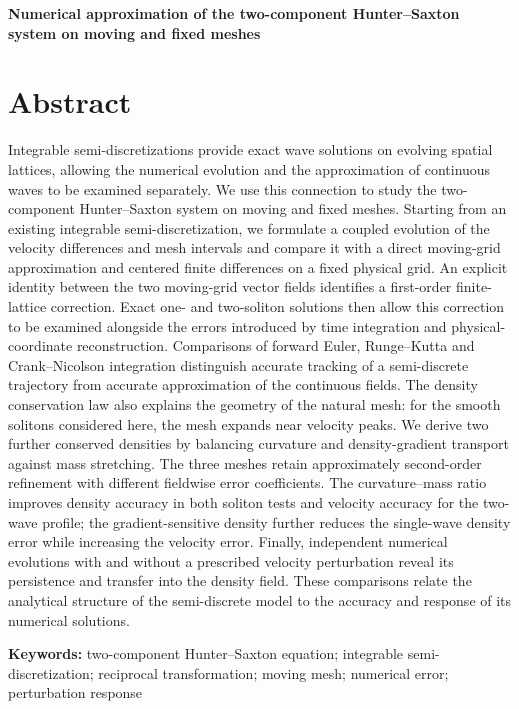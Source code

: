 \documentclass[11pt,a4paper]{article}
\begin{document}
{\centering\LARGE\bfseries Numerical approximation of the two-component Hunter–Saxton system on moving and fixed meshes\par}
\vspace{1.2em}
 
\FloatBarrier
\section*{Abstract}

Integrable semi-discretizations provide exact wave solutions on evolving spatial lattices, allowing the numerical evolution and the approximation of continuous waves to be examined separately. We use this connection to study the two-component Hunter–Saxton system on moving and fixed meshes. Starting from an existing integrable semi-discretization, we formulate a coupled evolution of the velocity differences and mesh intervals and compare it with a direct moving-grid approximation and centered finite differences on a fixed physical grid. An explicit identity between the two moving-grid vector fields identifies a first-order finite-lattice correction. Exact one- and two-soliton solutions then allow this correction to be examined alongside the errors introduced by time integration and physical-coordinate reconstruction. Comparisons of forward Euler, Runge–Kutta and Crank–Nicolson integration distinguish accurate tracking of a semi-discrete trajectory from accurate approximation of the continuous fields. The density conservation law also explains the geometry of the natural mesh: for the smooth solitons considered here, the mesh expands near velocity peaks. We derive two further conserved densities by balancing curvature and density-gradient transport against mass stretching. The three meshes retain approximately second-order refinement with different fieldwise error coefficients. The curvature--mass ratio improves density accuracy in both soliton tests and velocity accuracy for the two-wave profile; the gradient-sensitive density further reduces the single-wave density error while increasing the velocity error. Finally, independent numerical evolutions with and without a prescribed velocity perturbation reveal its persistence and transfer into the density field. These comparisons relate the analytical structure of the semi-discrete model to the accuracy and response of its numerical solutions.

\textbf{Keywords:} two-component Hunter–Saxton equation; integrable semi-discretization; reciprocal transformation; moving mesh; numerical error; perturbation response
\end{document}
